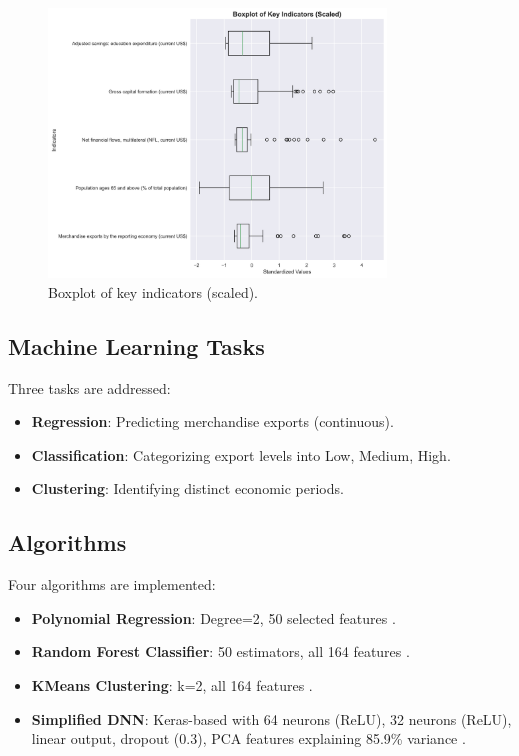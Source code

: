 \documentclass[12pt]{article}
\begin{document}
	\begin{figure}[H]
		\centering
		\includegraphics[width=0.8\textwidth]{../figures/boxplot.png}
		\caption{Boxplot of key indicators (scaled).}
		\label{fig:boxplot}
	\end{figure}
	
	\subsection{Machine Learning Tasks}
	Three tasks are addressed:
	\begin{itemize}
		\item \textbf{Regression}: Predicting merchandise exports (continuous).
		\item \textbf{Classification}: Categorizing export levels into Low, Medium, High.
		\item \textbf{Clustering}: Identifying distinct economic periods.
	\end{itemize}
	
	\subsection{Algorithms}
	Four algorithms are implemented:
	\begin{itemize}
		\item \textbf{Polynomial Regression}: Degree=2, 50 selected features \citep{hastie2009}.
		\item \textbf{Random Forest Classifier}: 50 estimators, all 164 features \citep{breiman2001}.
		\item \textbf{KMeans Clustering}: k=2, all 164 features \citep{hastie2009}.
		\item \textbf{Simplified DNN}: Keras-based with 64 neurons (ReLU), 32 neurons (ReLU), linear output, dropout (0.3), PCA features explaining 85.9\% variance \citep{hastie2009, chollet2015}.
	\end{itemize}
	
\end{document}
